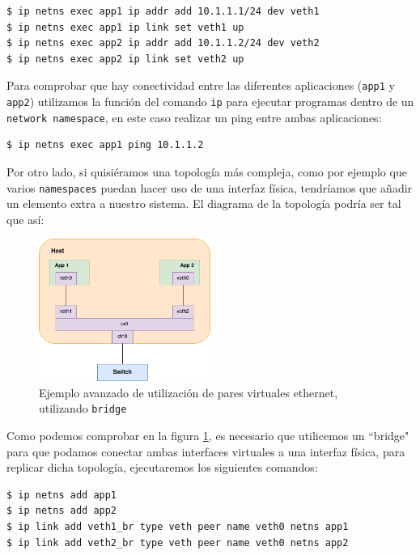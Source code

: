 \documentclass[12pt]{article}
\begin{document}
	\begin{verbatim}
$ ip netns exec app1 ip addr add 10.1.1.1/24 dev veth1
$ ip netns exec app1 ip link set veth1 up
$ ip netns exec app2 ip addr add 10.1.1.2/24 dev veth2
$ ip netns exec app2 ip link set veth2 up
	\end{verbatim}
	
	\pagebreak

	\noindent Para comprobar que hay conectividad entre las diferentes aplicaciones (\texttt{app1} y \texttt{app2}) utilizamos la función del comando \texttt{ip} para ejecutar programas dentro de un \texttt{network namespace}, en este caso realizar un ping entre ambas aplicaciones:
	
	\begin{verbatim}
$ ip netns exec app1 ping 10.1.1.2
	\end{verbatim}
	
	\noindent Por otro lado, si quisiéramos una topología más compleja, como por ejemplo que varios \texttt{namespaces} puedan hacer uso de una interfaz física, tendríamos que añadir un elemento extra a nuestro sistema. El diagrama de la topología podría ser tal que así:
	
	\begin{figure}[h!]
		\begin{center}
			\includegraphics[width=0.5\textwidth]{img/veth_ej2.png}
			\caption{Ejemplo avanzado de utilización de pares virtuales ethernet, utilizando \texttt{bridge}}
			\label{ej2 veth}
		\end{center}
	\end{figure}
	
	\noindent Como podemos comprobar en la figura \ref{ej2 veth}, es necesario que utilicemos un ``bridge" para que podamos conectar ambas interfaces virtuales a una interfaz física, para replicar dicha topología, ejecutaremos los siguientes comandos:
	
	\begin{verbatim}
$ ip netns add app1
$ ip netns add app2
$ ip link add veth1_br type veth peer name veth0 netns app1
$ ip link add veth2_br type veth peer name veth0 netns app2

	\end{verbatim}
	
\end{document}
